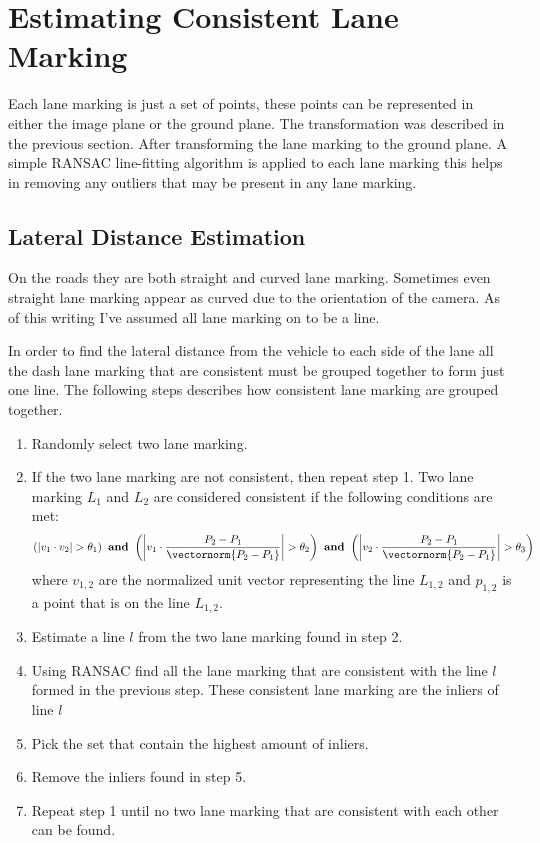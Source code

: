 \section{Estimating Consistent Lane Marking}

Each lane marking is just a set of points, these points can be represented in 
either the image plane or the ground plane. The transformation was described in 
the previous section. After transforming the lane marking to the ground plane. A 
simple RANSAC line-fitting algorithm is applied to each lane marking this helps 
in removing any outliers that may be present in any lane marking. 

\subsection{Lateral Distance Estimation}
On the roads they are both straight and curved lane marking. 
Sometimes even straight lane marking appear as curved due to the orientation of 
the camera. As of this writing I've assumed all lane marking on to be a line. 

In order to find the lateral distance from the vehicle to each side 
of the lane all the dash lane marking that are consistent must be grouped 
together to form just one line. The following steps describes how consistent 
lane marking are grouped together. 

\begin{enumerate}
\item Randomly select two lane marking.
\item If the two lane marking are not consistent, then repeat step 1.  Two lane marking $L_{1}$ and $L_{2}$ are considered consistent if the following 
conditions are met: 
\[ 
\left(|v_{1} \cdot v_{2}| > \theta_{1} \right) \textbf{ and }
\left(\left|v_{1} \cdot \frac{P_{2} - P_{1}}{\vectornorm{P_{2} - P_{1}}}\right| 
> \theta_{2} \right) \textbf{ and }
\left(\left|v_{2} \cdot \frac{P_{2} - P_{1}}{\vectornorm{P_{2} - P_{1}}}\right| 
> \theta_{3} \right)
\] 
where $v_{1,2}$ are the normalized unit vector representing the line $L_{1,2}$ 
and $p_{1,2}$ is a point that is on the line $L_{1,2}$.
\item Estimate a line $l$ from the two lane marking found in step 2.
\item Using RANSAC find all the lane marking that are consistent with the line 
$l$ formed in the previous step. These consistent lane marking are the inliers 
of line $l$
\item Pick the set that contain the highest amount of inliers.  
\item Remove the inliers found in step 5. 
\item Repeat step 1 until no two lane marking that are consistent with each 
other can be found. 
\end{enumerate}

